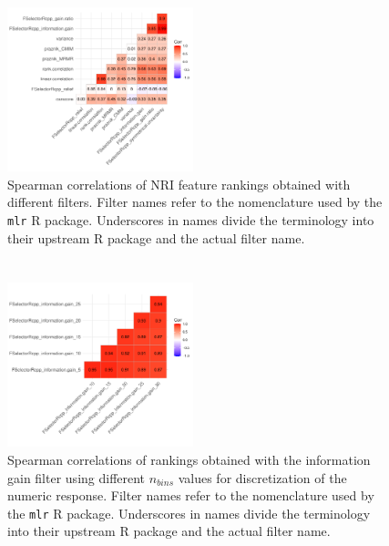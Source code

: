 \documentclass[final]{IEEEtran}
\begin{document}
\begin{figure} [ht]
	\begin{center}
		\includegraphics[width=0.48\textwidth] {correlation-filter-nri-1.pdf}
		\caption{Spearman correlations of NRI feature rankings obtained with different filters. Filter names refer to the nomenclature used by the \texttt{mlr} R package. Underscores in names divide the terminology into their upstream R package and the actual filter name.}\label{fig:correlation-filters}
	\end{center}
\end{figure}

\section{}

\begin{figure} [ht]
	\begin{center}
		\includegraphics[width=0.48\textwidth] {correlation-nbins-1.pdf}
		\caption{Spearman correlations of rankings obtained with the information gain filter using different \texttt{\(n_{bins}\)} values for discretization of the numeric response. Filter names refer to the nomenclature used by the \texttt{mlr} R package. Underscores in names divide the terminology into their upstream R package and the actual filter name.}\label{fig:correlation-nbins}
	\end{center}
\end{figure}
\end{document}
